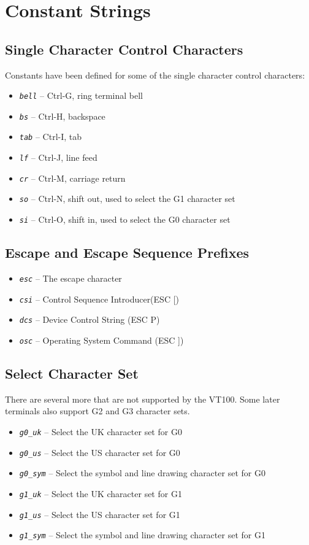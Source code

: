 \documentclass[10pt, openany]{book}
\newcommand{\constant}[1]{\emph{\texttt{#1}}}
\begin{document}
\section{Constant Strings}
\subsection{Single Character Control Characters}
Constants have been defined for some of the single character control characters:
\begin{itemize}
  \item \constant{bell} -- Ctrl-G, ring terminal bell
  \item \constant{bs} -- Ctrl-H, backspace
  \item \constant{tab} -- Ctrl-I, tab
  \item \constant{lf} -- Ctrl-J, line feed
  \item \constant{cr} -- Ctrl-M, carriage return
  \item \constant{so} -- Ctrl-N, shift out, used to select the G1 character set
  \item \constant{si} -- Ctrl-O, shift in, used to select the G0 character set
\end{itemize}

\subsection{Escape and Escape Sequence Prefixes}
\begin{itemize}
  \item \constant{esc} -- The escape character
  \item \constant{csi} -- Control Sequence Introducer(ESC [)
  \item \constant{dcs} -- Device Control String (ESC P)
  \item \constant{osc} -- Operating System Command (ESC ])
\end{itemize}

 \subsection{Select Character Set}
There are several more that are not supported by the VT100.  Some later terminals also support G2 and G3 character sets.
\begin{itemize}
  \item \constant{g0\_uk} -- Select the UK character set for G0
  \item \constant{g0\_us} -- Select the US character set for G0
  \item \constant{g0\_sym} -- Select the symbol and line drawing character set for G0
  \item \constant{g1\_uk} -- Select the UK character set for G1
  \item \constant{g1\_us} -- Select the US character set for G1
  \item \constant{g1\_sym} -- Select the symbol and line drawing character set for G1
\end{itemize}
\end{document}
